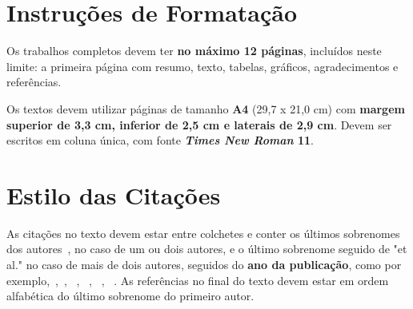 \documentclass[a4paper,11pt]{article}
\begin{document}
\section{ Instru\c c\~oes de Formata\c c\~ao}


Os trabalhos completos devem ter \textbf{no m\'aximo 12 p\'aginas}, inclu\'idos neste limite: a primeira p\'agina com resumo, texto, tabelas, gr\'aficos, agradecimentos e refer\^encias.

Os textos devem utilizar p\'aginas de tamanho \textbf{A4} (29,7 x 21,0 cm) com \textbf{margem superior de 3,3 cm, inferior de 2,5 cm e laterais de 2,9 cm}.
 Devem ser escritos em coluna \'unica, com fonte \textbf{\textit{Times New Roman} 11}. 



\section{ Estilo das Cita\c c\~oes}


As cita\c c\~oes no texto devem estar entre colchetes e conter  os \'ultimos sobrenomes dos autores~\citep{silva:99}, no caso de um ou dois autores, e o \'ultimo sobrenome seguido de "et al." no caso de mais de dois autores, seguidos do \textbf{ano da publica\c c\~ao}, como por exemplo,~\citep{anna:06},~\citep{gates:03}, ~\citep{smith:02}, ~\citep{silva:99}, ~\citep{pele:04}, ~\citep{web:16}.
As refer\^encias no final do texto devem estar em ordem alfab\'etica do \'ultimo sobrenome do primeiro autor. 


~\\


\end{document}

